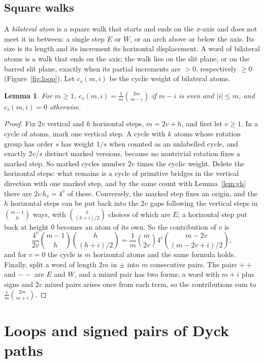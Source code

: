 \documentclass[11pt]{amsart}
\newtheorem{lemma}[theorem]{Lemma}
\theoremstyle{definition}
\theoremstyle{remark}
\begin{document}
\subsection*{Square walks} A \emph{bilateral atom} is a square walk that starts and ends on the $x$-axis and does not
meet it in between: a single step $E$ or $W$, or an arch above or below the axis. Its size is its length and its
increment its horizontal displacement. A word of bilateral atoms is a walk that ends on the axis; the walk lies on the
slit plane, or on the barred slit plane, exactly when its partial increments are $>0$, respectively $\ge0$
(Figure~\ref{fig:loop}). Let $c_s(m,i)$ be the cyclic weight of bilateral atoms.

\begin{lemma}\label{lem:cs}
For $m\ge1$, $c_s(m,i)=\frac1m\binom{2m}{m-i}$ if $m-i$ is even and $|i|\le m$, and $c_s(m,i)=0$ otherwise.
\end{lemma}

\begin{proof}
Fix $2v$ vertical and $h$ horizontal steps, $m=2v+h$, and first let $v\ge1$. In a cycle of atoms, mark one vertical
step. A cycle with $k$ atoms whose rotation group has order $s$ has weight $1/s$ when counted as an unlabelled
cycle, and exactly $2v/s$ distinct marked versions, because no nontrivial rotation fixes a marked step. So marked
cycles number $2v$ times the cyclic weight. Delete the horizontal steps: what remains is a cycle of primitive bridges in
the vertical direction with one marked step, and by the same count with Lemma~\ref{lem:gh} there are $2v\,h_v=4^v$ of
these. Conversely, the marked step fixes an origin, and the $h$ horizontal steps can be put back into the $2v$ gaps
following the vertical steps in $\binom{m-1}{h}$ ways, with $\binom{h}{(h+i)/2}$ choices of which are $E$; a horizontal
step put back at height $0$ becomes an atom of its own. So the contribution of $v$ is
\[
  \frac{4^v}{2v}\binom{m-1}{h}\binom{h}{(h+i)/2}=\frac1m\binom m{2v}4^v\binom{m-2v}{(m-2v+i)/2},
\]
and for $v=0$ the cycle is $m$ horizontal atoms and the same formula holds. Finally, split a word of length $2m$ in
$\pm$ into $m$ consecutive pairs. The pairs $++$ and $--$ are $E$ and $W$, and a mixed pair has two forms; a word with
$m+i$ plus signs and $2v$ mixed pairs arises once from each term, so the contributions sum to $\frac1m\binom{2m}{m+i}$.
\end{proof}

\section{Loops and signed pairs of Dyck paths}\label{sec:loops}
\end{document}

